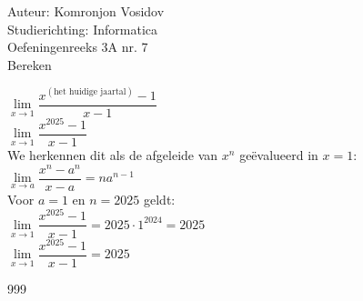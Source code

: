 \documentclass[a4paper]{article}
\begin{document}
	
	\noindent \large Auteur: Komronjon Vosidov \\
	\noindent \large Studierichting: Informatica\\
	\noindent \large Oefeningenreeks 3A nr. 7\\
	
	
	
	\normalsize
	 Bereken
	
	$\lim\limits_{x \to 1} \dfrac{x^{(\text{het huidige jaartal})} - 1}{x - 1}$\\
	
	
	$\lim\limits_{x \to 1} \dfrac{x^{2025} - 1}{x - 1}$\\
	
	
	We herkennen dit als de afgeleide van $x^{n}$ geëvalueerd in $x=1$:\\
	
	
	$\lim\limits_{x \to a} \dfrac{x^n - a^n}{x - a} = n a^{n-1}$\\
	
	
	Voor $a = 1$ en $n = 2025$ geldt:\\
	
	
	$\lim\limits_{x \to 1} \dfrac{x^{2025} - 1}{x - 1} = 2025 \cdot 1^{2024} = 2025$\\
	
	
	$\lim\limits_{x \to 1} \dfrac{x^{2025} - 1}{x - 1}=2025$\\
	
	
\begin{thebibliography}{999}
\end{thebibliography}	
	
\end{document}
